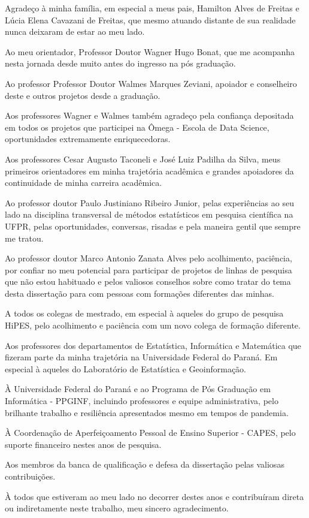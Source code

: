 \begin{agradece}	%


\begin{agradece}	%

Agradeço à minha família, em especial a meus pais, Hamilton Alves de Freitas e Lúcia Elena Cavazani de Freitas, que mesmo atuando distante de sua realidade nunca deixaram de estar ao meu lado.

Ao meu orientador, Professor Doutor Wagner Hugo Bonat, que me acompanha nesta jornada desde muito antes do ingresso na pós graduação.

Ao professor Professor Doutor Walmes Marques Zeviani, apoiador e conselheiro deste e outros projetos desde a graduação.

Aos professores Wagner e Walmes também agradeço pela confiança depositada em todos os projetos que participei na Ômega - Escola de Data Science, oportunidades extremamente enriquecedoras.

Aos professores Cesar Augusto Taconeli e José Luiz Padilha da Silva, meus primeiros orientadores em minha trajetória acadêmica e grandes apoiadores da continuidade de minha carreira acadêmica.

Ao professor doutor Paulo Justiniano Ribeiro Junior, pelas experiências ao seu lado na disciplina transversal de métodos estatísticos em pesquisa científica na UFPR, pelas oportunidades, conversas, risadas e pela maneira gentil que sempre me tratou.

Ao professor doutor Marco Antonio Zanata Alves pelo acolhimento, paciência, por confiar no meu potencial para participar de projetos de linhas de pesquisa que não estou habituado e pelos valiosos conselhos sobre como tratar do tema desta dissertação para com pessoas com formações diferentes das minhas.

A todos os colegas de mestrado, em especial à aqueles do grupo de pesquisa HiPES, pelo acolhimento e paciência com um novo colega de formação diferente.

Aos professores dos departamentos de Estatística, Informática e Matemática que fizeram parte da minha trajetória na Universidade Federal do Paraná. Em especial à aqueles do Laboratório de Estatística e Geoinformação. 

À Universidade Federal do Paraná e ao Programa de Pós Graduação em Informática - PPGINF, incluindo professores e equipe administrativa, pelo brilhante trabalho e resiliência apresentados mesmo em tempos de pandemia.

À Coordenação de Aperfeiçoamento Pessoal de Ensino Superior - CAPES, pelo suporte financeiro nestes anos de pesquisa.

Aos membros da banca de qualificação e defesa da dissertação pelas valiosas contribuições.

À todos que estiveram ao meu lado no decorrer destes anos e contribuíram direta ou indiretamente neste trabalho, meu sincero agradecimento.

\end{agradece}


\end{agradece}

